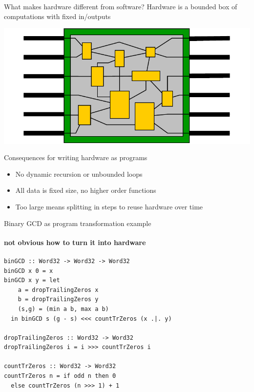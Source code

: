 \documentclass[pdf]{beamer}
\begin{document}
\begin{frame}{What makes hardware different from software?}
Hardware is a bounded box of computations with fixed in/outputs %
\begin{center}
\includegraphics[scale=0.6]{schematic}
\end{center}

\begin{block}{Consequences for writing hardware as programs}
\begin{itemize}
\item No dynamic recursion or unbounded loops
\item All data is fixed size, no higher order functions
\item \alert{Too large means splitting in steps to reuse hardware over time}
\end{itemize}
\end{block}
\end{frame}


\begin{frame}[fragile]{Binary GCD as program transformation example}
\framesubtitle{not obvious how to turn it into hardware}
\begin{block}{}
\begin{verbatim}
binGCD :: Word32 -> Word32 -> Word32       
binGCD x 0 = x
binGCD x y = let
    a = dropTrailingZeros x
    b = dropTrailingZeros y
    (s,g) = (min a b, max a b)
  in binGCD s (g - s) <<< countTrZeros (x .|. y)

dropTrailingZeros :: Word32 -> Word32
dropTrailingZeros i = i >>> countTrZeros i

countTrZeros :: Word32 -> Word32
countTrZeros n = if odd n then 0 
  else countTrZeros (n >>> 1) + 1
\end{verbatim}
\end{block}

\end{frame}
\end{document}
